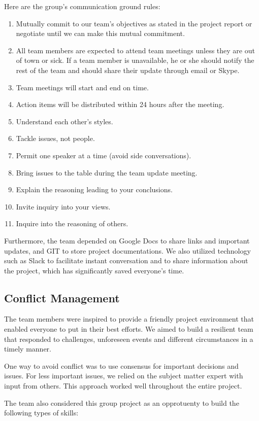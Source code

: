 \documentclass{article}
\begin{document}
Here are the group’s communication ground rules:
\begin{enumerate}
  \item Mutually commit to our team’s objectives as stated in the project report or negotiate until we can make this mutual commitment.
  \item All team members are expected to attend team meetings unless they are out of town or sick. If a team member is unavailable, he or she should notify the rest of the team and should share their update through email or Skype.
  \item Team meetings will start and end on time.
  \item Action items will be distributed within 24 hours after the meeting.
  \item Understand each other’s styles.
  \item Tackle issues, not people.
  \item Permit one speaker at a time (avoid side conversations).
  \item Bring issues to the table during the team update meeting.
  \item Explain the reasoning leading to your conclusions.
  \item Invite inquiry into your views.
  \item Inquire into the reasoning of others.
\end{enumerate}


Furthermore, the team depended on Google Docs to share links and important updates, and GIT to store project documentations. We also utilized technology such as Slack to facilitate instant conversation and to share information about the project, which has significantly saved everyone’s time.

\subsection{Conflict Management}
The team members were inspired to provide a friendly project environment that enabled everyone to put in their best efforts. We aimed to build a resilient team that responded to challenges, unforeseen events and different circumstances in a timely manner.

One way to avoid conflict was to use consensus for important decisions and issues. For less important issues, we relied on the subject matter expert with input from others. This approach worked well throughout the entire project.


\hfill \break %
The team also considered this group project as an opprotuenty to build the following types of skills:
\end{document}
